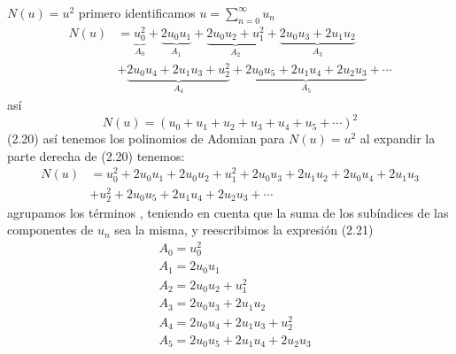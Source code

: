 \documentclass{amsart}
\begin{document}
$N(u)=u^2$
primero identificamos $u=\sum_{n=0}^{\infty} u_n$
\begin{align*}
	N(u) & =\underbrace{u_0^2}_{A_0}+\underbrace{2 u_0 u_1}_{A_1}+\underbrace{2 u_0 u_2+u_1^2}_{A_2}+\underbrace{2 u_0 u_3+2 u_1 u_2}_{A_3} \\
	& +\underbrace{2 u_0 u_4+2 u_1 u_3+u_2^2}_{A_4}+\underbrace{2 u_0 u_5+2 u_1 u_4+2 u_2 u_3}_{A_5}+\cdots \tag{2.22}
\end{align*}
así
$$
N(u)=\left(u_0+u_1+u_2+u_3+u_4+u_5+\cdots\right)^2
$$
(2.20) así tenemos los polinomios de Adomian para $N(u)=u^2$
al expandir la parte derecha de (2.20) tenemos:
\begin{align*}
	N(u) & =u_0^2+2 u_0 u_1+2 u_0 u_2+u_1^2+2 u_0 u_3+2 u_1 u_2+2 u_0 u_4+2 u_1 u_3 \\
	& +u_2^2+2 u_0 u_5+2 u_1 u_4+2 u_2 u_3+\cdots \tag{2.21}
\end{align*}
agrupamos los términos , teniendo en cuenta que la suma de los subíndices de las componentes de $u_n$ sea la misma, y reescribimos la expresión (2.21)
\begin{align*}
	& A_0=u_0^2 \\
	& A_1=2 u_0 u_1 \\
	& A_2=2 u_0 u_2+u_1^2 \\
	& A_3=2 u_0 u_3+2 u_1 u_2 \\
	& A_4=2 u_0 u_4+2 u_1 u_3+u_2^2 \\
	& A_5=2 u_0 u_5+2 u_1 u_4+2 u_2 u_3
\end{align*}
\end{document}
